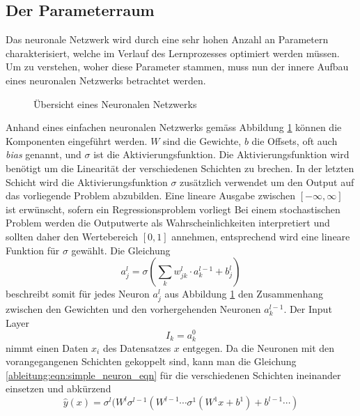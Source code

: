 \subsection{Der Parameterraum}
Das neuronale Netzwerk wird durch eine sehr hohen Anzahl an Parametern charakterisiert, welche im Verlauf des Lernprozesses optimiert werden müssen. Um zu verstehen, woher diese Parameter stammen, muss nun der innere Aufbau eines neuronalen Netzwerks betrachtet werden.
\begin{figure}
	\begin{center}
		
		\caption{Übersicht eines Neuronalen Netzwerks}
		\label{ableitung:fig:neuronal_network}
	\end{center}
\end{figure} 
Anhand eines einfachen neuronalen Netzwerks gemäss Abbildung \ref{ableitung:fig:neuronal_network} können die Komponenten eingeführt werden. $W$ sind die Gewichte, $b$ die Offsets, oft auch \textit{bias} genannt, und $\sigma$ ist die Aktivierungsfunktion. Die Aktivierungsfunktion wird benötigt um die Linearität der verschiedenen Schichten zu brechen. In der letzten Schicht wird die Aktivierungsfunktion $\sigma$ zusätzlich verwendet um den Output auf das vorliegende Problem abzubilden. Eine lineare Ausgabe zwischen $[-\infty, \infty]$ ist erwünscht, sofern ein Regressionsproblem vorliegt Bei einem stochastischen Problem werden die Outputwerte als Wahrscheinlichkeiten interpretiert und sollten daher den Wertebereich $[0,1]$ annehmen, entsprechend wird eine lineare Funktion für $\sigma$ gewählt. Die Gleichung
\begin{equation}
a^{l}_{j} = \sigma \left( \sum\limits_{k}w^{l}_{jk} \cdot a^{l-1}_{k}+b^{l}_{j} \right)
\label{ableitung:eqn:simple_neuron_eqn}
\end{equation}
beschreibt somit für jedes Neuron $a^{l}_{j}$ aus Abbildung \ref{ableitung:fig:neuronal_network} den Zusammenhang zwischen den Gewichten und den vorhergehenden Neuronen $a^{l-1}_{k}$. Der Input Layer 
\begin{equation}
I_k = a_{k}^{0}
\end{equation}
nimmt einen Daten $x_i$ des Datensatzes $x$ entgegen.
Da die Neuronen mit den vorangegangenen Schichten gekoppelt sind, kann man die Gleichung \eqref{ableitung:eqn:simple_neuron_eqn} für die verschiedenen Schichten ineinander einsetzen und abkürzend
\begin{equation}
\hat{y}(x) = \sigma^{l}(W^{l}\sigma^{l-1}(W^{l-1}\cdots \sigma^{1}(W^{1}x+b^{1}) + b^{l-1} \cdots )
\label{ableitung:eqn:full_net}
\end{equation}
